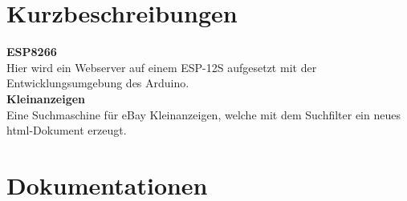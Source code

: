 \documentclass[11pt,fleqn]{book} %
\numberwithin{equation}{section} %
\numberwithin{figure}{section} %
\numberwithin{table}{section} %
\begin{document}





 \tableofcontents %
\newpage



\chapter{Kurzbeschreibungen}
\textbf{ESP8266}\\
Hier wird ein Webserver auf einem ESP-12S aufgesetzt mit der Entwicklungsumgebung des Arduino.\\
\textbf{Kleinanzeigen}\\
Eine Suchmaschine für eBay Kleinanzeigen, welche mit dem Suchfilter ein neues html-Dokument erzeugt.
\chapter{Dokumentationen}
\end{document}
